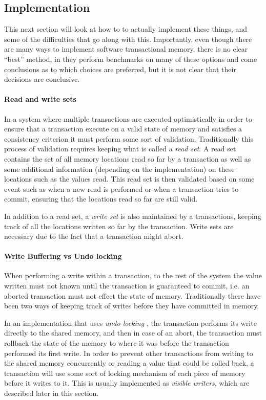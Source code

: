 \subsection{Implementation}
This next section will look at how to to actually implement these things, and some
 of the difficulties that go along with this.
Importantly, even though there are many ways to implement software transactional memory, there is no clear ``best''
method, in \cite{1123001} they 
perform benchmarks on many of these options and come conclusions as to which choices are
 preferred, but it is not clear that their decisions are conclusive.


\paragraph{Read and write sets}
In a system where multiple transactions are executed optimistically
in order to ensure that a transaction execute on a valid state of memory and satisfies
a consistency criterion it must perform some sort of validation.
Traditionally this process of validation requires keeping what is called a \emph{read set}.
A read set contains the set of all memory locations read so far by a transaction as well as some additional information
(depending on the implementation) on these locations such as the values read.
This read set is then validated based on some event such as when a new read is performed or when a transaction tries to commit,
 ensuring that the locations read so far are still valid.

In addition to a read set, a \emph{write set} is also maintained by a transactions, keeping track of all the locations
written so far by the transaction.
Write sets are necessary due to the fact that a transaction might abort.

\paragraph{Write Buffering vs Undo locking}
When performing a write within a transaction, to the rest of  the system the value
 written must not known until the transaction is guaranteed to commit,
i.e. an aborted transaction must not effect the state of memory.
Traditionally there have been two ways of keeping track of writes before they have committed in memory.

In an implementation that uses \emph{undo locking} \cite{},
 the transaction performs its write
 directly to the shared memory, and then in case of an abort, the transaction must
 rollback the state of the memory to where it was before the transaction performed its first write.
In order to prevent other transactions from writing to the shared memory concurrently
 or reading a value that could be rolled back, a transaction will use some sort of locking mechanism of each piece of memory before it writes to it.
This is usually implemented as \emph{visible writers}, which are described later in this section.

